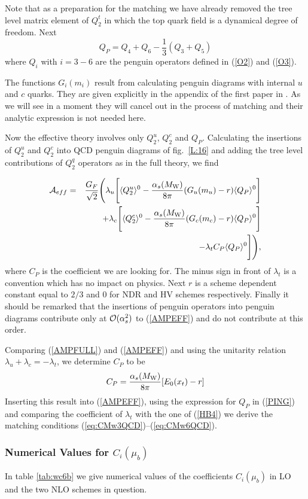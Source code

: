 \documentclass[12pt,rotate]{article}
\def\as{\alpha_s}
\newcommand{\mw}{M_{\rm W}}
\newcommand{\be}{\begin{equation}}
\newcommand{\ee}{\end{equation}}
\newcommand{\ord}{{\cal O}}
\begin{document}
\begin{itemize}
\begin{itemize}
Note that as a preparation for the matching we have already
removed the tree level matrix element of $Q_2^t$ in which
the top quark field is a dynamical degree of freedom.
Next
\be\label{PING}
Q_P=Q_4+Q_6-\frac{1}{3} (Q_3+Q_5)
\ee
where $Q_i$ with $i=3-6$ are the penguin operators defined
in (\ref{O2}) and (\ref{O3}).

The functions $G_i(m_i)$ result from calculating penguin diagrams
with internal $u$ and $c$ quarks. They are given explicitly in
the appendix of the first paper in \cite{BJLW1}. 
As we will see in a moment they will
cancel out in the process of matching and their analytic expression
is not needed here.

Now the effective theory involves only $Q_2^u$, $Q_2^c$ and $Q_P$.
Calculating the insertions of $Q_2^u$ and $Q_2^c$ into QCD penguin
diagrams of fig.~\ref{L:16} and adding the tree level contributions 
of $Q_2^q$ operators
as in the full theory, we find
 
\begin{eqnarray}\label{AMPEFF} 
{\cal A}_{eff} &=& 
\frac{G_F}{\sqrt{2}} 
\Bigg(\lambda_u \Bigg[\langle Q^u_2 \rangle^0  
 -\frac{\as(\mw)}{8\pi} (G_u(m_u)-r) \langle Q_P\rangle
^0\Bigg]
\nonumber\\ 
&& ~~~~~+\lambda_c \Bigg[\langle Q^c_2 \rangle^0  
 -\frac{\as(\mw)}{8\pi} (G_c(m_c)-r) \langle Q_P\rangle ^0\Bigg] 
\nonumber \\
&& ~~~~-\lambda_t C_P \langle Q_P\rangle ^0 \Bigg]\Bigg),
\end{eqnarray} 
where $C_P$ is the coefficient we are looking for. The minus sign
in front of $\lambda_t$ is a convention which has no impact on
physics. Next $r$ is a scheme dependent constant
equal to $2/3$ and $0$ for NDR and HV schemes respectively.
Finally it should be remarked that the insertions of penguin
operators into penguin diagrams contribute only at $\ord(\as^2)$
to (\ref{AMPEFF}) and do not contribute at this order.

Comparing (\ref{AMPFULL}) and (\ref{AMPEFF}) and using the unitarity
relation $\lambda_u+\lambda_c=-\lambda_t$, we determine $C_P$ to
be
\be\label{COFFCP}
C_P=\frac{\as(\mw)}{8\pi}[E_0(x_t)-r]
\ee
Inserting this result into (\ref{AMPEFF}), using the expression
for $Q_P$ in (\ref{PING}) and comparing the coefficient of $\lambda_t$
with the one of (\ref{HB4}) we derive the matching conditions 
(\ref{eq:CMw3QCD})--(\ref{eq:CMw6QCD}).  
\subsubsection{Numerical Values for $C_i(\mu_b)$}
In table \ref{tab:wc6b} we give numerical values of the coefficients
$C_i(\mu_b)$ in LO and the two NLO schemes in question.


\end{itemize}
\end{itemize}
\end{document}

